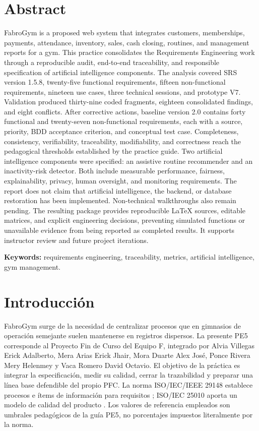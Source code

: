 \documentclass[11pt,a4paper]{article}
\begin{document}
\section*{Abstract}
FabroGym is a proposed web system that integrates customers, memberships, payments, attendance, inventory, sales, cash closing, routines, and management reports for a gym. This practice consolidates the Requirements Engineering work through a reproducible audit, end-to-end traceability, and responsible specification of artificial intelligence components. The analysis covered SRS version 1.5.8, twenty-five functional requirements, fifteen non-functional requirements, nineteen use cases, three technical sessions, and prototype V7. Validation produced thirty-nine coded fragments, eighteen consolidated findings, and eight conflicts. After corrective actions, baseline version 2.0 contains forty functional and twenty-seven non-functional requirements, each with a source, priority, BDD acceptance criterion, and conceptual test case. Completeness, consistency, verifiability, traceability, modifiability, and correctness reach the pedagogical thresholds established by the practice guide. Two artificial intelligence components were specified: an assistive routine recommender and an inactivity-risk detector. Both include measurable performance, fairness, explainability, privacy, human oversight, and monitoring requirements. The report does not claim that artificial intelligence, the backend, or database restoration has been implemented. Non-technical walkthroughs also remain pending. The resulting package provides reproducible LaTeX sources, editable matrices, and explicit engineering decisions, preventing simulated functions or unavailable evidence from being reported as completed results. It supports instructor review and future project iterations.

\textbf{Keywords:} requirements engineering, traceability, metrics, artificial intelligence, gym management.

\tableofcontents\listoftables\listoffigures\clearpage{}

\section{Introducción}
FabroGym surge de la necesidad de centralizar procesos que en gimnasios de operación semejante suelen mantenerse en registros dispersos. La presente PE5 corresponde al Proyecto Fin de Curso del Equipo F, integrado por Alvia Villegas Erick Adalberto, Mera Arias Erick Jhair, Mora Duarte Alex José, Ponce Rivera Mery Helenmey y Vaca Romero David Octavio. El objetivo de la práctica es integrar la especificación, medir su calidad, cerrar la trazabilidad y preparar una línea base defendible del propio PFC. La norma ISO/IEC/IEEE 29148 establece procesos e ítems de información para requisitos \cite{iso29148}; ISO/IEC 25010 aporta un modelo de calidad del producto \cite{iso25010}. Los valores de referencia empleados son umbrales pedagógicos de la guía PE5, no porcentajes impuestos literalmente por la norma.
\end{document}
